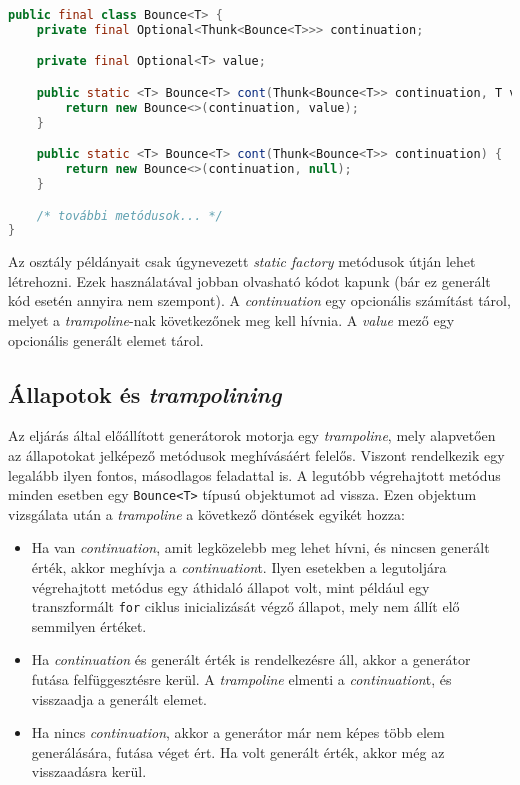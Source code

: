 \begin{lstlisting}[language=Java, caption={A \texttt{Bounce<T>} osztály legfontosabb mezői és metódusai}, captionpos=b, label=JavaBounce, escapechar=$]
public final class Bounce<T> {
    private final Optional<Thunk<Bounce<T>>> continuation;

    private final Optional<T> value;

    public static <T> Bounce<T> cont(Thunk<Bounce<T>> continuation, T value) {
        return new Bounce<>(continuation, value);
    }

    public static <T> Bounce<T> cont(Thunk<Bounce<T>> continuation) {
        return new Bounce<>(continuation, null);
    }

    /* további metódusok... */
}
\end{lstlisting}    

Az osztály példányait csak úgynevezett \textit{static factory} metódusok útján lehet létrehozni. Ezek használatával jobban olvasható kódot kapunk (bár ez generált kód esetén annyira nem szempont). A \textit{continuation} egy opcionális számítást tárol, melyet a \textit{trampoline}-nak következőnek meg kell hívnia. A \textit{value} mező egy opcionális generált elemet tárol. 

\subsection{Állapotok és \textit{trampolining}}

Az eljárás által előállított generátorok motorja egy \textit{trampoline}, mely alapvetően az állapotokat jelképező metódusok meghívásáért felelős. Viszont rendelkezik egy legalább ilyen fontos, másodlagos feladattal is. A legutóbb végrehajtott metódus minden esetben egy \texttt{Bounce<T>} típusú objektumot ad vissza. Ezen objektum vizsgálata után a \textit{trampoline} a következő döntések egyikét hozza:

\begin{itemize}
    \item Ha van \textit{continuation}, amit legközelebb meg lehet hívni, és nincsen generált érték, akkor meghívja a \textit{continuation}t. Ilyen esetekben a legutoljára végrehajtott metódus egy áthidaló állapot volt, mint például egy transzformált \texttt{for} ciklus inicializását végző állapot, mely nem állít elő semmilyen értéket.
    \item Ha \textit{continuation} és generált érték is rendelkezésre áll, akkor a generátor futása felfüggesztésre kerül. A \textit{trampoline} elmenti a \textit{continuation}t, és visszaadja a generált elemet.
    \item Ha nincs \textit{continuation}, akkor a generátor már nem képes több elem generálására, futása véget ért. Ha volt generált érték, akkor még az visszaadásra kerül.
\end{itemize}

